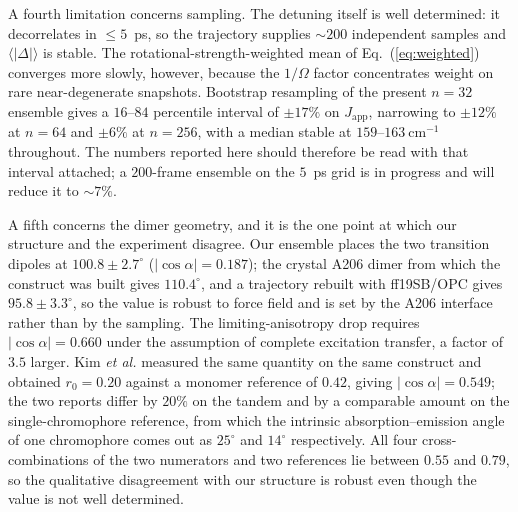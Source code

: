 \documentclass[journal=jpcbfk, manuscript=article, layout=twocolumn, doi=true]{achemso}
\begin{document}
A fourth limitation concerns sampling. The detuning itself is well determined:
it decorrelates in $\le 5$~ps, so the trajectory supplies $\sim\!200$
independent samples and $\langle|\Delta|\rangle$ is stable. The
rotational-strength-weighted mean of Eq.~(\ref{eq:weighted}) converges more
slowly, however, because the $1/\Omega$ factor concentrates weight on rare
near-degenerate snapshots. Bootstrap resampling of the present $n=32$ ensemble
gives a $16$--$84$ percentile interval of $\pm17\%$ on $J_{\mathrm{app}}$,
narrowing to $\pm12\%$ at $n=64$ and $\pm6\%$ at $n=256$, with a median stable
at $159$--$163~\mathrm{cm^{-1}}$ throughout. The numbers reported here should
therefore be read with that interval attached; a $200$-frame ensemble on the
$5$~ps grid is in progress and will reduce it to $\sim\!7\%$.

A fifth concerns the dimer geometry, and it is the one point at which our
structure and the experiment disagree. Our ensemble places the two transition
dipoles at $100.8 \pm 2.7^\circ$ ($|\cos\alpha| = 0.187$); the crystal
A206 dimer from which the construct was built gives $110.4^\circ$, and a
trajectory rebuilt with ff19SB/OPC gives $95.8 \pm 3.3^\circ$, so the value is
robust to force field and is set by the A206 interface rather than by the
sampling. The limiting-anisotropy drop requires $|\cos\alpha| = 0.660$ under
the assumption of complete excitation transfer, a factor of $3.5$ larger. Kim
\emph{et al.} measured the same quantity on the same construct and obtained
$r_{0} = 0.20$ against a monomer reference of $0.42$, giving
$|\cos\alpha| = 0.549$; the two reports differ by $20\%$ on the tandem and by
a comparable amount on the single-chromophore reference, from which the
intrinsic absorption--emission angle of one chromophore comes out as
$25^{\circ}$ and $14^{\circ}$ respectively. All four cross-combinations of the
two numerators and two references lie between $0.55$ and $0.79$, so the
qualitative disagreement with our structure is robust even though the value is
not well determined.
\end{document}
